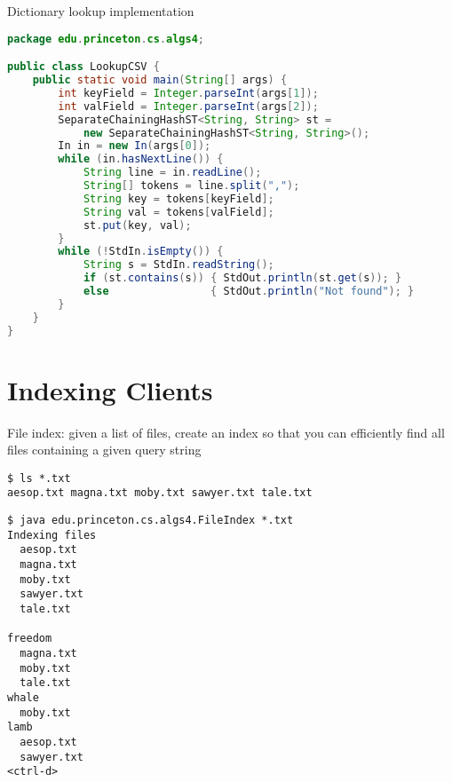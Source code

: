 \documentclass[8pt,a4paper,compress]{beamer}
\begin{document}
\begin{frame}[fragile]
Dictionary lookup implementation
\begin{lstlisting}[language=Java]
package edu.princeton.cs.algs4;

public class LookupCSV {
    public static void main(String[] args) {
        int keyField = Integer.parseInt(args[1]);
        int valField = Integer.parseInt(args[2]);
        SeparateChainingHashST<String, String> st = 
            new SeparateChainingHashST<String, String>();
        In in = new In(args[0]);
        while (in.hasNextLine()) {
            String line = in.readLine();
            String[] tokens = line.split(",");
            String key = tokens[keyField];
            String val = tokens[valField];
            st.put(key, val);
        }
        while (!StdIn.isEmpty()) {
            String s = StdIn.readString();
            if (st.contains(s)) { StdOut.println(st.get(s)); }
            else                { StdOut.println("Not found"); }
        }
    }
}
\end{lstlisting}
\end{frame}

\section{Indexing Clients}
\begin{frame}[fragile]
File index: given a list of files, create an index so that you can efficiently find all files containing a given query string

\begin{lstlisting}[language={}]
$ ls *.txt
aesop.txt magna.txt moby.txt sawyer.txt tale.txt 
\end{lstlisting}

\begin{lstlisting}[language={}]
$ java edu.princeton.cs.algs4.FileIndex *.txt
Indexing files
  aesop.txt 
  magna.txt 
  moby.txt 
  sawyer.txt 
  tale.txt 

freedom
  magna.txt 
  moby.txt 
  tale.txt
whale
  moby.txt
lamb
  aesop.txt
  sawyer.txt 
<ctrl-d>
\end{lstlisting}
\end{frame}
\end{document}
